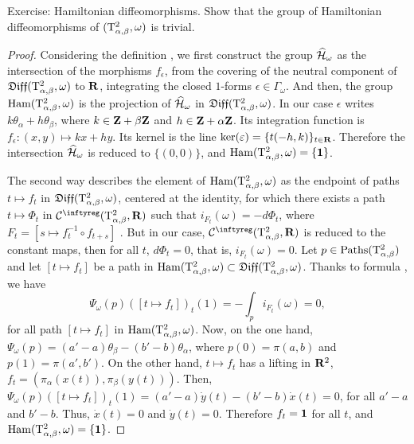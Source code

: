 \begin{Article}{Exercise: Hamiltonian diffeomorphisms.}{}
  Show that the group of Hamiltonian diffeomorphisms of $(\mathrm{T}^2_{\alpha,\beta},\omega)$ is trivial.
\end{Article}

\begin{proof}
  Considering the definition \cite[\textsection\,9.15]{PIZ13},
  we first construct the group $\widehat{\mathcal{H}}_\omega$ as the intersection of the morphisms $f_\epsilon$,
  from the covering of the neutral component of $\mathfrak{Diff}(\mathrm{T}^2_{\alpha,\beta},\omega)$ to $\mathbf{R}$,
  integrating the closed $1$-forms $\epsilon \in \Gamma_\omega$.
  And then,
  the group $\operatorname{Ham}(\mathrm{T}^2_{\alpha,\beta},\omega)$ is the projection of $\widehat{\mathcal{H}}_\omega$ in $\mathfrak{Diff}(\mathrm{T}^2_{\alpha,\beta},\omega)$.
  In our case $\epsilon$ writes $k\theta_\alpha + h\theta_\beta$,
  where $k\in \mathbf{Z}+\beta\mathbf{Z}$ and $h\in \mathbf{Z}+\alpha\mathbf{Z}$.
  Its integration function is $f_\epsilon :(x,y) \mapsto kx+hy$.
  Its kernel is the line $\mathrm{ker}(\varepsilon)=\{t(-h,k)\}_{t\in \mathbf{R}}$.
  Therefore the intersection $\widehat{\mathcal{H}}_\omega$ is reduced to $\{(0,0)\}$,
  and $\operatorname{Ham}(\mathrm{T}^2_{\alpha,\beta},\omega)=\{{\mathbf{1}}\}$.
  
  The second way describes the element of $\operatorname{Ham}(\mathrm{T}^2_{\alpha,\beta},\omega)$ as the endpoint of paths $t\mapsto f_t$ in $\mathfrak{Diff}(\mathrm{T}^2_{\alpha,\beta},\omega)$,
  centered at the identity,
  for which there exists a path $t\mapsto \Phi_t$ in $\Cinfty(\Torus^2_{\alpha,\beta},\RR)$ such that $i_{F_t}(\omega) = - d\Phi_t$,
  where $F_t=[s \mapsto f_t^{-1}\circ f_{t+s}]$ \cite[\textsection\,9.16]{PIZ13}.
  But in our case,
  $\Cinfty(\Torus^2_{\alpha,\beta},\RR)$ is reduced to the constant maps,
  then for all $t$,
  $d\Phi_t=0$,
  that is,
  $i_{F_t}(\omega) = 0$.
  Let $p \in \operatorname{Paths}(\mathrm{T}^2_{\alpha,\beta})$ and let $[t \mapsto f_t]$ be a path in $\operatorname{Ham}(\mathrm{T}^2_{\alpha,\beta}, \omega) \subset \mathfrak{Diff}(\mathrm{T}^2_{\alpha,\beta}, \omega)$.
  Thanks to formula \cite[\textsection\,9.2 $(\clubsuit)$]{PIZ13}, we have
  $$%
    \Psi_\omega(p)([t \mapsto f_t])_t(1) = - \int_p i_{F_t}(\omega) = 0,
    $$%
  for all path $[t \mapsto f_t]$ in $\operatorname{Ham}(\mathrm{T}^2_{\alpha,\beta}, \omega)$.
  Now,
  on the one hand,
  $\Psi_\omega(p)=(a'-a)\theta_\beta - (b'-b)\theta_\alpha$,
  where $p(0)=\pi(a,b)$ and $p(1)=\pi(a',b')$.
  On the other hand,
  $t \mapsto f_t$ has a lifting in $\mathbf{R}^2$,
  $f_t= (\pi_\alpha(x(t)),\pi_\beta(y(t)))$.
  Then,
  $\Psi_\omega(p)([t \mapsto f_t])_t(1)=(a'-a)\dot y(t) - (b'-b)\dot x(t) = 0$,
  for all $a'-a$ and $b'-b$.
  Thus,
  $\dot x(t)=0$ and $\dot y(t)=0$.
  Therefore $f_t={\mathbf{1}}$ for all $t$,
  and $\operatorname{Ham}(\mathrm{T}^2_{\alpha,\beta}, \omega)=\{{\mathbf{1}}\}$.
\end{proof}
